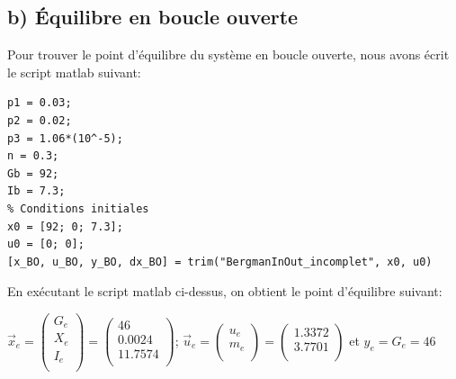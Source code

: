 \documentclass[11pt, a4paper]{article}
\begin{document}
\subsection*{b) Équilibre en boucle ouverte}
Pour trouver le point d'équilibre du système en boucle ouverte, nous avons écrit le script matlab suivant: 
\begin{lstlisting}[style=matlab]
% Declaration des variables utilisees dans simulink
p1 = 0.03;
p2 = 0.02;
p3 = 1.06*(10^-5);
n = 0.3;
Gb = 92;
Ib = 7.3;
% Conditions initiales 
x0 = [92; 0; 7.3];
u0 = [0; 0];
[x_BO, u_BO, y_BO, dx_BO] = trim("BergmanInOut_incomplet", x0, u0)
\end{lstlisting}
En exécutant le script matlab ci-dessus, on obtient le point d'équilibre suivant:
\begin{center}
$\vec{x}_e=\begin{pmatrix}
G_e \\
X_e \\
I_e \\
\end{pmatrix}=
\begin{pmatrix}
46 \\
0.0024 \\
11.7574 \\
\end{pmatrix}$; $\vec{u}_e=\begin{pmatrix}
u_e \\
m_e \\
\end{pmatrix}=\begin{pmatrix} 
1.3372 \\
3.7701 \\
\end{pmatrix}$ et $y_e=G_e=46$
\end{center}
\end{document}
